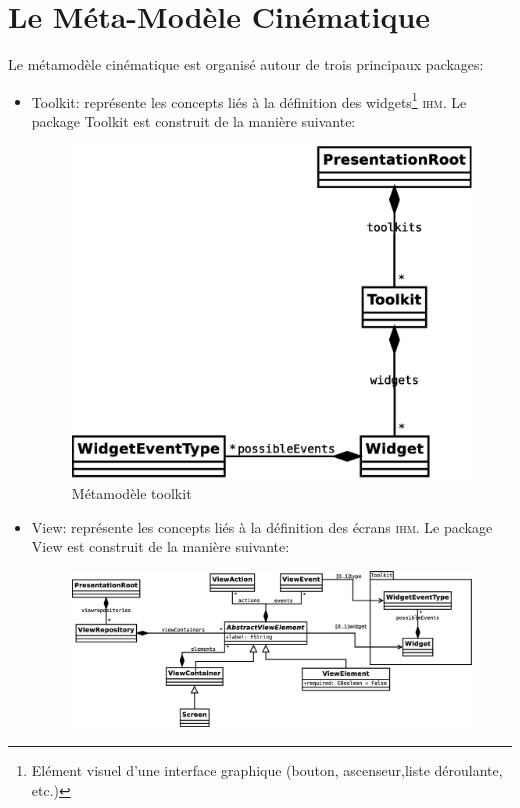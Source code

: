 \section{Le Méta-Modèle Cinématique}
Le métamodèle cinématique est organisé autour de trois principaux packages:
\begin{itemize}
  \item Toolkit: représente les concepts liés à la définition des widgets\footnote{Elément visuel d'une interface graphique (bouton, ascenseur,liste déroulante, etc.)} \textsc{ihm}.
\newline
Le package Toolkit est construit de la manière suivante:
\newline
\begin{figure}[htb]
  \centering
  \includegraphics[scale=.3]{img/toolkit.eps}
  \caption{Métamodèle toolkit}
  \label{fig:Métamodèle Toolkit}
\end{figure}
  \item View: représente les concepts liés à la définition des écrans \textsc{ihm}.
\newline
Le package View est construit de la manière suivante:
\newline
\begin{figure}[H]
  \centering
  \includegraphics[scale=.3]{img/view.eps}

\end{figure}
\end{itemize}
